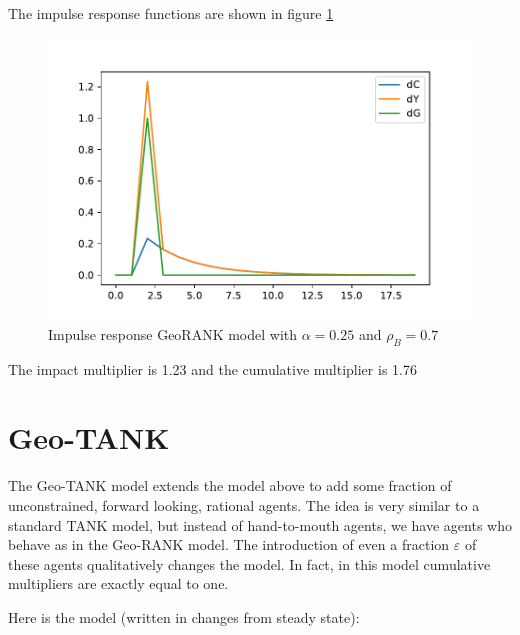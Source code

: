 \documentclass{article}
\begin{document}
The impulse response functions are shown in figure \ref{fig:GeoRANK_irf}
\begin{figure} 
	\begin{centering}
		\includegraphics[scale=0.7]{../../Python/DoloCode/GeoTANK/Figures/GeoRANK_irf.pdf}
		\caption{Impulse response GeoRANK model with $\alpha=0.25$ and $\rho_B=0.7$}
		\label{fig:GeoRANK_irf}
	\end{centering}
\end{figure}
The impact multiplier is 1.23 and the cumulative multiplier is 1.76



\section{Geo-TANK}
The Geo-TANK model extends the model above to add some fraction of unconstrained, forward looking, rational agents. The idea is very similar to a standard TANK model, but instead of hand-to-mouth agents, we have agents who behave as in the Geo-RANK model. The introduction of even a fraction $\varepsilon$ of these agents qualitatively changes the model. In fact, in this model cumulative multipliers are exactly equal to one.

Here is the model (written in changes from steady state):
\end{document}
